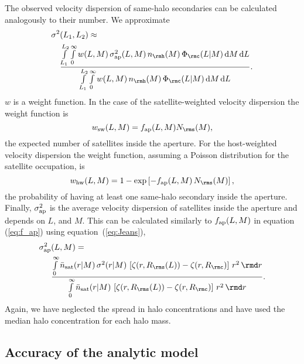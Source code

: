 \documentclass[fleqn,usenatbib,useAMS]{mnras}
\begin{document}
	The observed velocity dispersion of same-halo secondaries can be calculated analogously to their number. We approximate
	\begin{align}
	\sigma^2 &(L_1, L_2) \approx \nonumber\\
	&\frac{\int\limits_{L_1}^{L_2}\int\limits_0^\infty w (L, M) \, \sigma^2_{\rm ap} (L, M) \, n_\rmh (M) \, \Phi_\rmc (L | M) \, \mathrm{d}M \, \mathrm{d}L}{\int\limits_{L_1}^{L_2}\int\limits_0^\infty w (L, M) \, n_\rmh (M) \, \Phi_\rmc (L | M) \, \mathrm{d}M \, \mathrm{d}L}.
	\end{align}
	$w$ is a weight function. In the case of the satellite-weighted velocity  dispersion the weight function is
	\begin{equation}
	w_{\rm sw} (L, M) = f_{\rm ap} (L, M) N_\rms (M),
	\end{equation}
	the expected number of satellites inside the aperture. For the host-weighted velocity dispersion the weight function, assuming a Poisson distribution for the satellite occupation, is
	\begin{equation}
	w_{\rm hw} (L, M) = 1 - \exp \left[ - f_{\rm ap} (L, M) \, N_\rms (M) \right],
	\end{equation}
	the probability of having at least one same-halo secondary inside the aperture. Finally, $\sigma^2_{\rm ap}$ is the average velocity dispersion of satellites inside the aperture and depends on $L$, and $M$. This can be calculated similarly to $f_{\rm ap} (L, M)$ in equation (\ref{eq:f_ap}) using equation~(\ref{eq:Jeans}),
	\begin{align}
	\sigma^2_{\rm ap} & (L, M) = \nonumber\\
	&\frac{\int\limits_0^\infty \bar{n}_{\rm sat} (r | M) \, \sigma^2 (r | M) \, \left[\zeta(r, R_\rms(L)) - \zeta(r, R_\rmc)\right] \, r^2 \, \rmd r}{\int\limits_0^\infty \bar{n}_{\rm sat} (r | M) \, \left[\zeta(r, R_\rms(L)) - \zeta(r, R_\rmc)\right] \, r^2 \, \rmd r}.
	\end{align}
	Again, we have neglected the spread in halo concentrations and have used the median halo concentration for each halo mass.
	
	\subsection{Accuracy of the analytic model}
	\label{subsec:accuracy_analytic}
	
\end{document}
